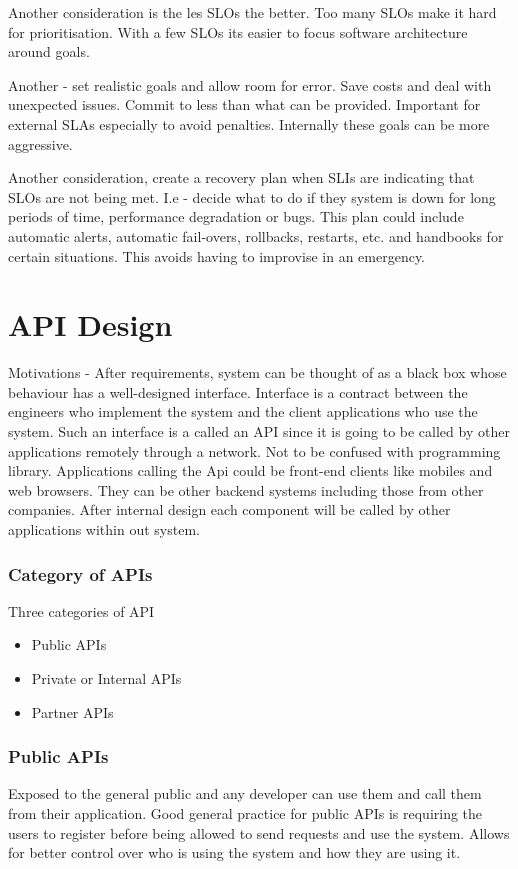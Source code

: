 \documentclass[a4paper, 11pt]{book}
\begin{document}
    Another consideration is the les SLOs the better.
    Too many SLOs make it hard for prioritisation.
    With a few SLOs its easier to focus software architecture around goals.

    Another - set realistic goals and allow room for error.
    Save costs and deal with unexpected issues.
    Commit to less than what can be provided.
    Important for external SLAs especially to avoid penalties.
    Internally these goals can be more aggressive.

    Another consideration, create a recovery plan when SLIs are indicating that SLOs are not being met.
    I.e - decide what to do if they system is down for long periods of time, performance degradation or bugs.
    This plan could include automatic alerts, automatic fail-overs, rollbacks, restarts, etc.
    and handbooks for certain situations.
    This avoids having to improvise in an emergency.


    \chapter{API Design}
    Motivations - After requirements, system can be thought of as a black box whose behaviour has a well-designed interface.
    Interface is a contract between the engineers who implement the system and the client applications who use the system.
    Such an interface is a called an API since it is going to be called by other applications remotely through a network.
    Not to be confused with programming library.
    Applications calling the Api could be front-end clients like mobiles and web browsers.
    They can be other backend systems including those from other companies.
    After internal design each component will be called by other applications within out system.

    \subsection{Category of APIs}
    Three categories of API
    \begin{itemize}
        \item Public APIs
        \item Private or Internal APIs
        \item Partner APIs
    \end{itemize}

    \subsection{Public APIs}
    Exposed to the general public and any developer can use them and call them from their application.
    Good general practice for public APIs is requiring the users to register before being allowed to send requests and use the system.
    Allows for better control over who is using the system and how they are using it.
\end{document}
